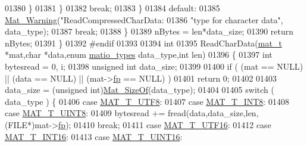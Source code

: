 \begin{DoxyCode}
01380                 \}
01381             \}
01382             \textcolor{keywordflow}{break};
01383         \}
01384         \textcolor{keywordflow}{default}:
01385             \hyperlink{group__mat__util_gafcedc83eb7e4759a8ea5c974c4f801c3}{Mat\_Warning}(\textcolor{stringliteral}{"ReadCompressedCharData: %
01386                 \textcolor{stringliteral}{"type for character data"}, data\_type);
01387             \textcolor{keywordflow}{break};
01388     \}
01389     nBytes = len*data\_size;
01390     \textcolor{keywordflow}{return} nBytes;
01391 \}
01392 \textcolor{preprocessor}{#endif}
01393 
01394 \textcolor{keywordtype}{int}
01395 ReadCharData(\hyperlink{struct__mat__t}{mat\_t} *mat,\textcolor{keywordtype}{char} *data,\textcolor{keyword}{enum} \hyperlink{group___m_a_t_gacf7b3b879282b7ab3a51190e49bf3453}{matio\_types} data\_type,\textcolor{keywordtype}{int} len)
01396 \{
01397     \textcolor{keywordtype}{int} bytesread = 0, i;
01398     \textcolor{keywordtype}{unsigned} \textcolor{keywordtype}{int} data\_size;
01399 
01400     \textcolor{keywordflow}{if} ( (mat == NULL) || (data == NULL) || (mat->\hyperlink{struct__mat__t_a85f562e407ca9ad4d2a6e14f839432b7}{fp} == NULL) )
01401         \textcolor{keywordflow}{return} 0;
01402 
01403     data\_size = (\textcolor{keywordtype}{unsigned} int)\hyperlink{group__mat__util_gab6774aabdc124c540c1e7686d0804940}{Mat\_SizeOf}(data\_type);
01404 
01405     \textcolor{keywordflow}{switch} ( data\_type ) \{
01406         \textcolor{keywordflow}{case} \hyperlink{group___m_a_t_ggacf7b3b879282b7ab3a51190e49bf3453ac34ad81f5cbd3b7d0d95e57e5be0149b}{MAT\_T\_UTF8}:
01407         \textcolor{keywordflow}{case} \hyperlink{group___m_a_t_ggacf7b3b879282b7ab3a51190e49bf3453a9807f5033ed4f9b548953742d9fd1658}{MAT\_T\_INT8}:
01408         \textcolor{keywordflow}{case} \hyperlink{group___m_a_t_ggacf7b3b879282b7ab3a51190e49bf3453a01c1bd7db68f90552862eb5d311be408}{MAT\_T\_UINT8}:
01409             bytesread += fread(data,data\_size,len,(FILE*)mat->\hyperlink{struct__mat__t_a85f562e407ca9ad4d2a6e14f839432b7}{fp});
01410             \textcolor{keywordflow}{break};
01411         \textcolor{keywordflow}{case} \hyperlink{group___m_a_t_ggacf7b3b879282b7ab3a51190e49bf3453a87ffc0412143c326a1fcc759d5d81bdc}{MAT\_T\_UTF16}:
01412         \textcolor{keywordflow}{case} \hyperlink{group___m_a_t_ggacf7b3b879282b7ab3a51190e49bf3453a8c5b2e381946e95ea8d81ac216743302}{MAT\_T\_INT16}:
01413         \textcolor{keywordflow}{case} \hyperlink{group___m_a_t_ggacf7b3b879282b7ab3a51190e49bf3453a05bc7af7680aa68be95126ae0a4c2e31}{MAT\_T\_UINT16}:
}
\end{DoxyCode}
